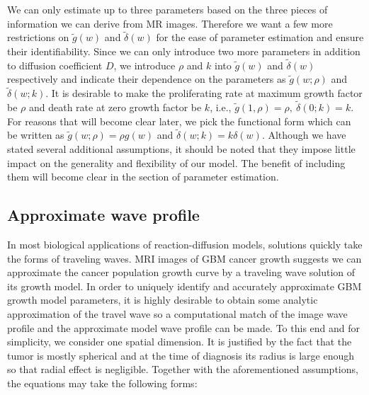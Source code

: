 \documentclass{aims}
\numberwithin{equation}{section}
\begin{document}
We can only estimate up to three parameters based on the three pieces of information
we can derive from MR images. Therefore we want a few more restrictions
on $\tilde{g}(w)$ and $\tilde{\delta}(w)$ for the ease of parameter
estimation and ensure their identifiability. Since we can only introduce
two more parameters in addition to diffusion coefficient $D$, we
introduce $\rho$ and $k$ into $\tilde{g}(w)$ and $\tilde{\delta}(w)$
respectively and indicate their dependence on the parameters as $\tilde{g}(w;\rho)$
and $\tilde{\delta}(w;k)$. It is desirable to make the proliferating
rate at maximum growth factor be $\rho$
and death rate at zero growth factor
be $k$, i.e., $\tilde{g}(1,\rho)=\rho,\ \tilde{\delta}(0;k)=k$.
For reasons that will become clear later, we pick the functional form
which can be written as $\tilde{g}(w;\rho)=\rho g(w)$ and $\tilde{\delta}(w;k)=k\delta(w)$.
Although we have stated several additional assumptions, it should
be noted that they impose little impact on the generality and flexibility
of our model. The benefit of including them will become clear in the
section of parameter estimation. 

\subsection{Approximate wave profile}
In most biological applications of reaction-diffusion models, solutions quickly take the forms of traveling waves. MRI images of GBM cancer growth suggests we can approximate
the cancer population growth curve by a traveling wave solution of its growth model.
In order to uniquely identify and accurately approximate GBM growth model parameters,
it is highly desirable to obtain some analytic approximation of the travel wave so a 
computational match of the image wave profile and the approximate model wave profile can be made.
To this end and for simplicity, we consider one spatial dimension. It is justified
by the fact that the tumor is mostly spherical and at the time of
diagnosis its radius is large enough so that radial effect is negligible.
Together with the aforementioned assumptions, the equations may take the following forms:
\end{document}
